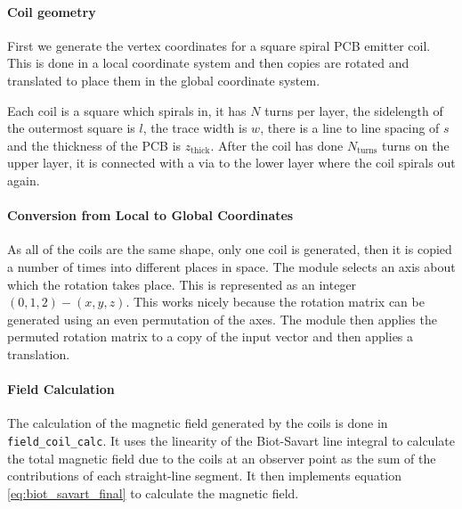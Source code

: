 \paragraph{Coil geometry}
First we generate the vertex coordinates for a square spiral PCB emitter coil. This is done in a local coordinate system and then copies are rotated and translated to place them in the global coordinate system. 

Each coil is a square which spirals in, it has $N$ turns per layer, the sidelength of the outermost square is $l$, the trace width is $w$, there is a line to line spacing of $s$ and the thickness of the PCB is $z_\mathrm{thick}$. After the coil has done $N_{\mathrm{turns}}$ turns on the upper layer, it is connected with a via to the lower layer where the coil spirals out again. 

\paragraph{Conversion from Local to Global Coordinates}
As all of the coils are the same shape, only one coil is generated, then it is copied a number of times into different places in space. 
The module selects an axis about which the rotation takes place. This is represented as an integer $(0,1,2) - (x,y,z)$. This works nicely because the rotation matrix can be generated using an even permutation of the axes. The module then applies the permuted rotation matrix to a copy of the input vector and then applies a translation.

\paragraph{Field Calculation}
The calculation of the magnetic field generated by the coils is done in \lstinline[style=python]|field_coil_calc|. It uses the linearity of the Biot-Savart line integral to calculate the total magnetic field due to the coils at an observer point as the sum of the contributions of each straight-line segment. It then implements equation \eqref{eq:biot_savart_final} to calculate the magnetic field.



